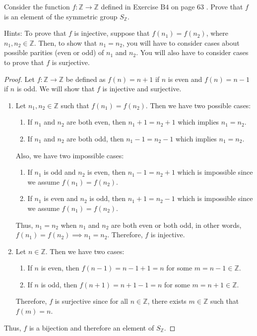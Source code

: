 \documentclass[12pt]{article}
\newenvironment{problem}[2][Problem]{\begin{trivlist}
\item[\hskip \labelsep {\bfseries #1}\hskip \labelsep {\bfseries #2.}]}{\end{trivlist}}
\begin{document}
\begin{problem}{2}
Consider the function $f: \mathbb{Z} \rightarrow \mathbb{Z}$ defined in Exercise $\mathrm{B} 4$ on page 63 . Prove that $f$ is an element of the symmetric group $S_{\mathbb{Z}}$.

Hints: To prove that $f$ is injective, suppose that $f\left(n_{1}\right)=f\left(n_{2}\right)$, where $n_{1}, n_{2} \in \mathbb{Z}$. Then, to show that $n_{1}=n_{2}$, you will have to consider cases about possible parities (even or odd) of $n_{1}$ and $n_{2}$. You will also have to consider cases to prove that $f$ is surjective.
\begin{proof}
	Let $f: \mathbb{Z} \rightarrow \mathbb{Z}$ be defined as $f(n) = n+1$ if $n$ is even and $f(n) = n - 1$ if $n$ is odd. We will show that $f$ is injective and surjective.
	\begin{enumerate}
		\item Let $n_1, n_2 \in \mathbb{Z}$ such that $f(n_1) = f(n_2)$. Then we have two possible cases:	 
		\begin{enumerate}
			\item If $n_1$ and $n_2$ are both even, then $n_1 + 1 = n_2 + 1$ which implies $n_1 = n_2$.
			\item If $n_1$ and $n_2$ are both odd, then $n_1 - 1 = n_2 - 1$ which implies $n_1 = n_2$.
		\end{enumerate}
		Also, we have two impossible cases:
		\begin{enumerate}
			\item If $n_1$ is odd and $n_2$ is even, then $n_1 - 1 = n_2 + 1$ 
				which is impossible since we assume $f(n_1) = f(n_2)$.
			\item If $n_1$ is even and $n_2$ is odd, then $n_1 + 1 = n_2 - 1$ which is impossible 
				since we assume $f(n_1) = f(n_2)$.
		\end{enumerate}
		Thus, $n_1 = n_2$ when $n_1$ and $n_2$ are both even or both odd, in other words,
		$f(n_1) = f(n_2) \implies n_1 = n_2$. Therefore, $f$ is injective.
		\item Let $n \in \mathbb{Z}$. Then we have two cases:
		\begin{enumerate}
			\item If $n$ is even, then $f(n-1) = n-1+1 = n$ for some $m = n-1 \in \mathbb{Z}$.
			\item If $n$ is odd, then $f(n+1) = n+1-1 = n$ for some $m = n+1 \in \mathbb{Z}$.
		\end{enumerate}
		Therefore, $f$ is surjective since for all $n \in \mathbb{Z}$, there exists $m \in \mathbb{Z}$ such that $f(m) = n$.
	\end{enumerate}
	Thus, $f$ is a bijection and therefore an element of $S_{\mathbb{Z}}$.

\end{proof}
\end{problem}
\end{document}
